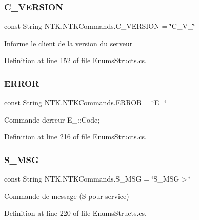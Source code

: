 \subsubsection{\texorpdfstring{C\_VERSION}{C\_VERSION}}
{\footnotesize\ttfamily const String N\+T\+K.\+N\+T\+K\+Commands.\+C\+\_\+\+V\+E\+R\+S\+I\+ON = \char`\"{}C\+\_\+\+V\+\_\+\char`\"{}}



Informe le client de la version du serveur 



Definition at line 152 of file Enums\+Structs.\+cs.

\mbox{\label{struct_n_t_k_1_1_n_t_k_commands_a4069e2042c02428360bad186824c9976}} 
\subsubsection{\texorpdfstring{ERROR}{ERROR}}
{\footnotesize\ttfamily const String N\+T\+K.\+N\+T\+K\+Commands.\+E\+R\+R\+OR = \char`\"{}E\+\_\+\char`\"{}}



Commande d\textquotesingle{}erreur E\+\_\+\+::\+Code; 



Definition at line 216 of file Enums\+Structs.\+cs.

\mbox{\label{struct_n_t_k_1_1_n_t_k_commands_a9fbd7e4ff74bd0102218f94c1c28168e}} 
\subsubsection{\texorpdfstring{S\_MSG}{S\_MSG}}
{\footnotesize\ttfamily const String N\+T\+K.\+N\+T\+K\+Commands.\+S\+\_\+\+M\+SG = \char`\"{}S\+\_\+\+M\+SG$>$\char`\"{}}



Commande de message (S pour service) 



Definition at line 220 of file Enums\+Structs.\+cs.

\mbox{\label{struct_n_t_k_1_1_n_t_k_commands_a1f6318b53c11d4507d9c9e509a5ad875}} 
